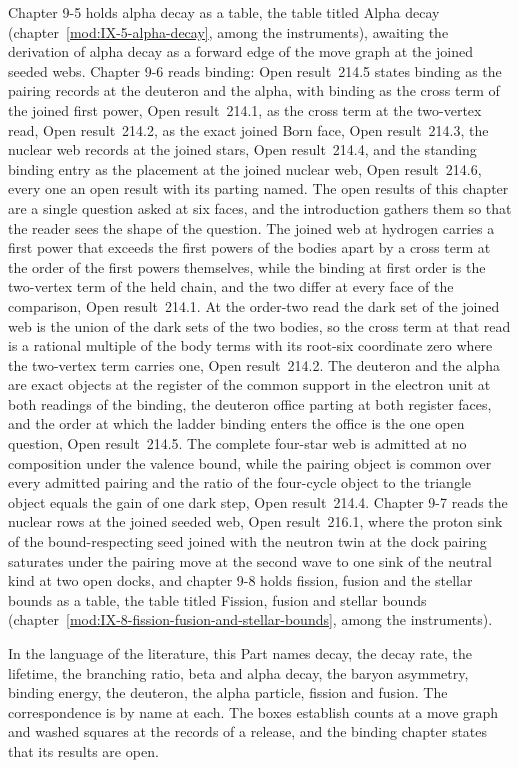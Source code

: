 Chapter 9-5 holds alpha decay as a table, the table titled Alpha decay (chapter~\ref{mod:IX-5-alpha-decay}, among the instruments), awaiting the derivation of alpha decay as a forward edge of the move graph at the joined seeded webs. Chapter 9-6 reads binding: Open result~214.5 states binding as the pairing records at the deuteron and the alpha, with binding as the cross term of the joined first power, Open result~214.1, as the cross term at the two-vertex read, Open result~214.2, as the exact joined Born face, Open result~214.3, the nuclear web records at the joined stars, Open result~214.4, and the standing binding entry as the placement at the joined nuclear web, Open result~214.6, every one an open result with its parting named. The open results of this chapter are a single question asked at six faces, and the introduction gathers them so that the reader sees the shape of the question. The joined web at hydrogen carries a first power that exceeds the first powers of the bodies apart by a cross term at the order of the first powers themselves, while the binding at first order is the two-vertex term of the held chain, and the two differ at every face of the comparison, Open result~214.1. At the order-two read the dark set of the joined web is the union of the dark sets of the two bodies, so the cross term at that read is a rational multiple of the body terms with its root-six coordinate zero where the two-vertex term carries one, Open result~214.2. The deuteron and the alpha are exact objects at the register of the common support in the electron unit at both readings of the binding, the deuteron office parting at both register faces, and the order at which the ladder binding enters the office is the one open question, Open result~214.5. The complete four-star web is admitted at no composition under the valence bound, while the pairing object is common over every admitted pairing and the ratio of the four-cycle object to the triangle object equals the gain of one dark step, Open result~214.4. Chapter 9-7 reads the nuclear rows at the joined seeded web, Open result~216.1, where the proton sink of the bound-respecting seed joined with the neutron twin at the dock pairing saturates under the pairing move at the second wave to one sink of the neutral kind at two open docks, and chapter 9-8 holds fission, fusion and the stellar bounds as a table, the table titled Fission, fusion and stellar bounds (chapter~\ref{mod:IX-8-fission-fusion-and-stellar-bounds}, among the instruments).

In the language of the literature, this Part names decay, the decay rate, the lifetime, the branching ratio, beta and alpha decay, the baryon asymmetry, binding energy, the deuteron, the alpha particle, fission and fusion. The correspondence is by name at each. The boxes establish counts at a move graph and washed squares at the records of a release, and the binding chapter states that its results are open.

